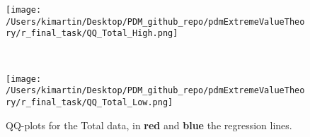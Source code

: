 \begin{figure}[h!]
	\centering
	\begin{minipage}[b]{0.4\textwidth}
		\centering
		\texttt{[image: /Users/kimartin/Desktop/PDM\_github\_repo/pdmExtremeValueTheory/r\_final\_task/QQ\_Total\_High.png]}
		\label{fig:QQTotal1}
	\end{minipage}
	~
	\begin{minipage}[b]{0.4\textwidth}
		\centering
		\texttt{[image: /Users/kimartin/Desktop/PDM\_github\_repo/pdmExtremeValueTheory/r\_final\_task/QQ\_Total\_Low.png]}
		\label{fig:QQTotal2}
	\end{minipage}
	\caption{QQ-plots for the Total data, in \textbf{red} and \textbf{blue} the regression lines. \\}
\end{figure}
\paragraph{}
